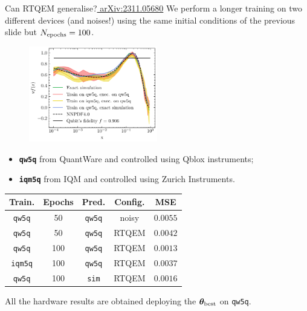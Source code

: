 \documentclass[8pt, xcolor={svgnames}, hyperref={linkcolor=black}]{beamer}
\begin{document}
\begin{frame}{Can RTQEM generalise?\hfill \href{https://arxiv.org/abs/2311.05680}{\faBook\,\,arXiv:2311.05680}}
We perform a longer training on two different devices (and noises!) using the same 
initial conditions of the previous slide but $N_{\rm epochs}=100$. 
\pause
\begin{multicols}{2}

\begin{figure}
    \includegraphics[width=0.5\textwidth]{figures/100.pdf}%
\end{figure}
\pause
\begin{center}
\begin{itemize}[noitemsep]
  \item[\faCog] \textbf{\texttt{qw5q}} from QuantWare and controlled using Qblox instruments;
  \item[\faCog] \textbf{\texttt{iqm5q}} from IQM and controlled using Zurich Instruments.
\end{itemize}
\pause
\footnotesize
\begin{table}
\begin{tabular}{ccccc}
\hline \hline 
\textbf{Train.} & \textbf{Epochs} & \textbf{Pred.} &  \textbf{Config.} & MSE \\
\hline    
\texttt{qw5q} & 50 & \texttt{qw5q} & noisy & $0.0055$  \\     
\texttt{qw5q} & 50 & \texttt{qw5q} & RTQEM & $0.0042$ \\ 
\hline 
\texttt{qw5q} & 100 & \texttt{qw5q} & RTQEM & $0.0013$  \\     
\texttt{iqm5q} & 100 & \texttt{qw5q} & RTQEM & $0.0037$ \\   
\texttt{qw5q} & 100& \texttt{sim} & RTQEM & $0.0016$ \\   
\hline \hline
\end{tabular}
\centering
\end{table}
\end{center}
\end{multicols}
\pause
All the hardware results are obtained deploying the $\bm{\theta}_{\rm best}$ on 
\texttt{qw5q}.
\end{frame}
\end{document}
